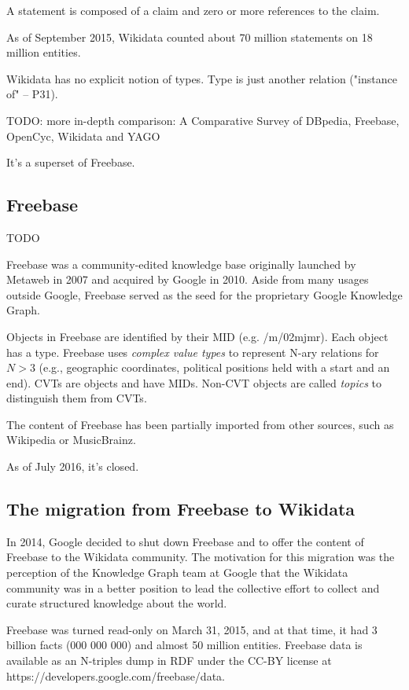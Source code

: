 A statement is composed of a claim and zero or more references to the claim.

As of September 2015, Wikidata counted about 70 million statements on 18 million
entities.

Wikidata has no explicit notion of types. Type is just another relation
("instance of" -- P31).

TODO: more in-depth comparison: A Comparative Survey of DBpedia, Freebase,
OpenCyc, Wikidata and YAGO

It's a superset of Freebase.

\subsection{Freebase}

TODO

Freebase was a community-edited knowledge base originally launched by Metaweb in
2007 and acquired by Google in 2010. Aside from many usages outside Google,
Freebase served as the seed for the proprietary Google Knowledge
Graph\cite{kg-refinement-survey}.

Objects in Freebase are identified by their MID (e.g. /m/02mjmr). Each object
has a type.
Freebase uses \textit{complex value types} to represent N-ary relations for
$N>3$ (e.g., geographic coordinates, political positions held with a start and
an end). CVTs are objects and have MIDs. Non-CVT objects are called
\textit{topics} to distinguish them from CVTs.

The content of Freebase has been partially imported from other sources, such as
Wikipedia or MusicBrainz.

As of July 2016, it's closed.

\subsection{The migration from Freebase to Wikidata\cite{freebase-wikidata-migration}}

In 2014, Google decided to shut down Freebase and to offer the content
of Freebase to the Wikidata community.
The motivation for this migration was the perception of the Knowledge Graph team
at Google that the Wikidata community was in a better position to lead the
collective effort to collect and curate structured knowledge about the world.

Freebase was turned read-only on March 31, 2015, and at that time, it had 3
billion facts (000 000 000) and almost 50 million entities. Freebase data is
available as an N-triples dump in RDF under the CC-BY license at
https://developers.google.com/freebase/data.

